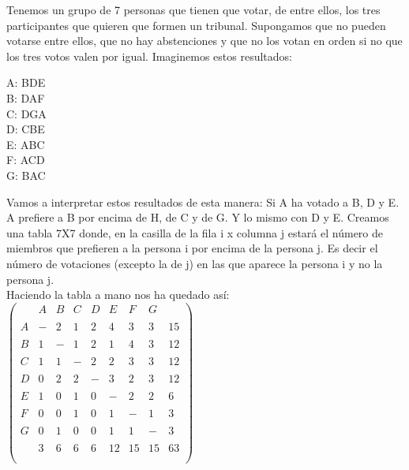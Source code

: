 \documentclass[a4paper]{article}
\begin{document}
		Tenemos un grupo de 7 personas que tienen que votar, de entre ellos, los tres participantes que quieren que formen un tribunal. Supongamos que no pueden votarse entre ellos, que no hay abstenciones y que no los votan en orden si no que los tres votos valen por igual. Imaginemos estos resultados:\\
\begin{center}
A: BDE \\

B: DAF \\

C: DGA\\

D: CBE\\

E: ABC\\

F: ACD\\

G: BAC\\
\end{center}

Vamos a interpretar estos resultados de esta manera: Si A ha votado a B, D y E. A prefiere a B por encima de H, de C y de G. Y lo mismo con D y E. Creamos una tabla 7X7 donde, en la casilla de la fila i x columna j estará el número de miembros que prefieren a la persona i por encima de la persona j. Es decir el número de votaciones  (excepto la de j) en las que aparece la persona i y no la persona j.\\

Haciendo la tabla a mano nos ha quedado así:\\

\hspace{3cm}$\begin{pmatrix}
     & A & B & C & D & E & F & G & \\ \\
   A & - & 2 & 1 & 2 & 4 & 3 & 3 & 15\\ \\
   B & 1 & - & 1 & 2 & 1 & 4 & 3 & 12\\\\
   C & 1 & 1 & - & 2 & 2 & 3 & 3 & 12\\\\
   D & 0 & 2 & 2 & - & 3 & 2 & 3 & 12\\\\
   E & 1 & 0 & 1 & 0 & - & 2 & 2 & 6\\\\
   F & 0 & 0 & 1 & 0 & 1 & - & 1 & 3\\\\
   G & 0 & 1 & 0 & 0 & 1 & 1 & - & 3\\\\
     & 3 & 6 & 6 & 6 & 12 & 15 & 15 & 63\\\\
\end{pmatrix}$\\
\\
\end{document}
